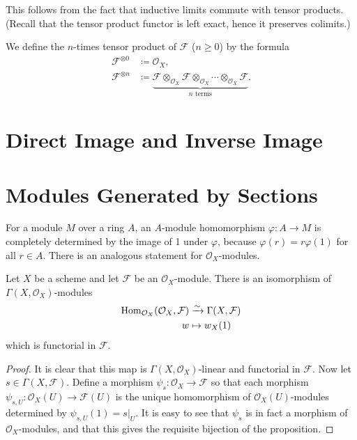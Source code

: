 This follows from the fact that inductive limits commute with tensor products. (Recall that the tensor product functor is left exact, hence it preserves colimits.)

We define the $n$-times tensor product of $\mathcal{F}$ ($n \geq 0$) by the formula
\begin{align*}
	\mathcal{F}^{\otimes 0} & \coloneqq \mathcal{O}_X,\\
	\mathcal{F}^{\otimes n} & \coloneqq \underbrace{\mathcal{F} \otimes_{\mathcal{O}_X} \mathcal{F} \otimes_{\mathcal{O}_X} \dotsb \otimes_{\mathcal{O}_X} \mathcal{F}}_{n \text{ terms}}.
\end{align*}

\section{Direct Image and Inverse Image}


\section{Modules Generated by Sections}

For a module $M$ over a ring $A$, an $A$-module homomorphism $\varphi \colon A \to M$ is completely determined by the image of 1 under $\varphi$, because $\varphi(r) = r \varphi(1)$ for all $r \in A$. There is an analogous statement for $\mathcal{O}_X$-modules.

\begin{proposition}
	Let $X$ be a scheme and let $\mathcal{F}$ be an $\mathcal{O}_X$-module. There is an isomorphism of $\Gamma(X, \mathcal{O}_X)$-modules
	\begin{align*}
		\operatorname{Hom}_{\mathcal{O}_X}(\mathcal{O}_X, \mathcal{F}) & \xrightarrow{\sim} \Gamma(X, \mathcal{F}) \\
		w & \mapsto w_X(1)
	\end{align*}
	which is functorial in $\mathcal{F}$.
\end{proposition}
\begin{proof}
	It is clear that this map is $\Gamma(X, \mathcal{O}_X)$-linear and functorial in $\mathcal{F}$. Now let $s \in \Gamma(X, \mathcal{F})$. Define a morphism $\psi_s \colon \mathcal{O}_X \to \mathcal{F}$ so that each morphism $\psi_{s, U} \colon \mathcal{O}_X(U) \to \mathcal{F}(U)$ is the unique homomorphism of $\mathcal{O}_X(U)$-modules determined by $\psi_{s, U}(1) = s|_U$. It is easy to see that $\psi_s$ is in fact a morphism of $\mathcal{O}_X$-modules, and that this gives the requisite bijection of the proposition.
\end{proof}

